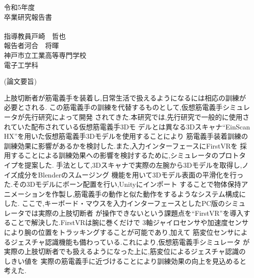 \documentclass{ltjsreport}
\begin{document}
\begin{titlepage}
\begin{center}
\huge 令和5年度\\
\vspace{30pt}
\huge 卒業研究報告書\\
\vspace{50pt}
\HUGE{}\\
\vspace{250pt}
\huge 指導教員\hspace{10pt}戸崎　哲也\\
\huge 報告者\hspace{28pt}河合　将暉\\
\vspace{50pt}
\huge 神戸市立工業高等専門学校\\
\huge 電子工学科
\end{center}
\end{titlepage}
\restoregeometry
\clearpage

\begin{center}
\LARGE (論文要旨)
\end{center}

上肢切断者が筋電義手を装着し,日常生活で扱えるようになるには相応の訓練が必要とされる.
この筋電義手の訓練を代替するものとして,仮想筋電義手シミュレータが先行研究によって開発
されてきた.本研究では,先行研究で一般的に使用されていた配布されている仮想筋電義手3Dモ
デルとは異なる3Dスキャナ``EinScan HX''を用いた仮想筋電義手3Dモデルを使用することにより
筋電義手装着訓練の訓練効果に影響があるかを検討した.また,入力インターフェースにFirstVRを
採用することによる訓練効果への影響を検討するために,シミュレータのプロトタイプを提案した.
手法として,3Dスキャナで実際の左腕から3Dモデルを取得し,ノイズ成分をBlenderのスムージング
機能を用いて3Dモデル表面の平滑化を行った.その3Dモデルにボーン配置を行い,Unityにインポート
することで物体保持アニメーションを作製し,筋電義手の動作と似た動作をするようなシステム構成にした.
ここで,キーボード・マウスを入力インターフェースとしたPC版のシミュレータでは実際の上肢切断者
が操作できないという課題点を``FirstVR''を導入することで解決した.FirstVRは腕に巻くだけで
3軸ジャイロセンサや加速度センサにより腕の位置をトラッキングすることが可能であり,加えて
筋変位センサによるジェスチャ認識機能も備わっている.これにより,仮想筋電義手シミュレータ
が実際の上肢切断者でも扱えるようになった上に,筋変位によるジェスチャ認識のしきい値を
実際の筋電義手に近づけることにより訓練効果の向上を見込めると考えた.
\end{document}
